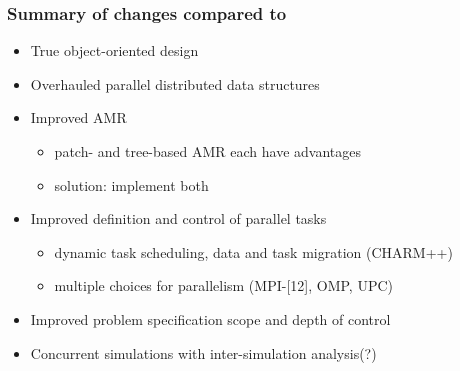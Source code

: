 \begin{frame}
\frametitle{Summary of changes compared to \enzo}
\begin{itemize}
\item {} True object-oriented design
\item {} Overhauled parallel distributed data structures
\item {} Improved AMR
\begin{itemize}
\item {}  patch- and tree-based AMR each have advantages
\item {} solution: implement both
\end{itemize}
\item {} Improved definition and control of parallel tasks
\begin{itemize}
\item {} dynamic task scheduling, data and task migration (CHARM++)
\item {} multiple choices for parallelism (MPI-[12], OMP, UPC)
\end{itemize}
\item {} Improved problem specification scope and depth of control
\item {} Concurrent simulations with inter-simulation analysis(?)
\end{itemize}
\end{frame}
